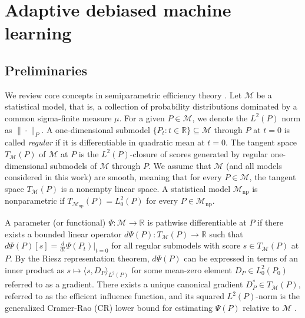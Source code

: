 \documentclass[11pt]{article}
\theoremstyle{definition}
\begin{document}
 




\section{Adaptive debiased machine learning}
\label{section::AMLEGeneral}

 
\subsection{Preliminaries}

\label{sec::prelim}

We review core concepts in semiparametric efficiency theory \citep{bickel1993efficient}. Let $\mathcal{M}$ be a statistical model, that is, a collection of probability distributions dominated by a common sigma-finite measure $\mu$. For a given $P\in\mathcal{M}$, we denote the $L^2(P)$ norm as $\|\cdot\|_P$. A one-dimensional submodel $\{P_t: t \in \mathbb{R}\} \subseteq \mathcal{M}$ through $P$ at $t=0$ is called \textit{regular} if it is differentiable in quadratic mean at $t=0$. The tangent space $T_\mathcal{M}(P)$ of $\mathcal{M}$ at $P$ is the $L^2(P)$-closure of scores generated by regular one-dimensional submodels of $\mathcal{M}$ through $P$. We assume that $\mathcal{M}$ (and all models considered in this work) are smooth, meaning that for every $P \in \mathcal{M}$, the tangent space $T_\mathcal{M}(P)$ is a nonempty linear space. A statistical model $\mathcal{M}_{\mathrm{np}}$ is nonparametric if $T_{\mathcal{M}_{\mathrm{np}}}(P) = L^2_0(P)$ for every $P \in \mathcal{M}_{\mathrm{np}}$. 

A parameter (or functional) $\Psi: \mathcal{M} \rightarrow \mathbb{R}$ is pathwise differentiable at $P$ if there exists a bounded linear operator $d\Psi(P): T_\mathcal{M}(P) \rightarrow \mathbb{R}$ such that $d\Psi(P)[s] = \frac{d}{dt} \Psi(P_t) \big|_{t=0}$ for all regular submodels with score $s \in T_\mathcal{M}(P)$ at $P$. By the Riesz representation theorem, $d\Psi(P)$ can be expressed in terms of an inner product as $s\mapsto \langle s,  D_P \rangle_{L^2(P)}$ for some mean-zero element $D_P \in L^2_0(P_0)$ referred to as a gradient. There exists a unique canonical gradient $D_P^*\in T_\mathcal{M}(P)$, referred to as the efficient influence function, and its squared $L^2(P)$-norm is the generalized Cramer-Rao (CR) lower bound for estimating $\Psi(P)$ relative to $\mathcal{M}$ \citep{bickel1993efficient}.
\end{document}
